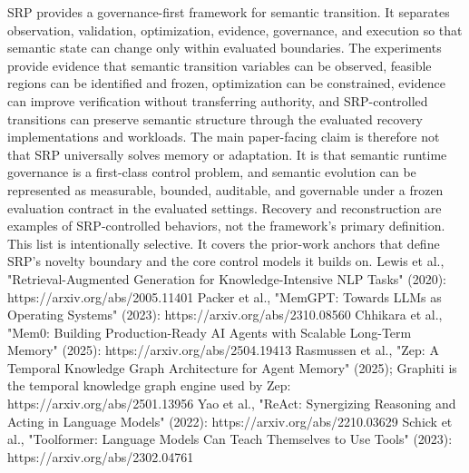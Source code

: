 {}
\markdownRendererSectionEnd \markdownRendererSectionBegin
{}\markdownRendererInterblockSeparator
{}SRP provides a governance-first framework for semantic transition. It separates observation, validation, optimization, evidence, governance, and execution so that semantic state can change only within evaluated boundaries. The experiments provide evidence that semantic transition variables can be observed, feasible regions can be identified and frozen, optimization can be constrained, evidence can improve verification without transferring authority, and SRP-controlled transitions can preserve semantic structure through the evaluated recovery implementations and workloads.\markdownRendererParagraphSeparator
{}The main paper-facing claim is therefore not that SRP universally solves memory or adaptation. It is that semantic runtime governance is a first-class control problem, and semantic evolution can be represented as measurable, bounded, auditable, and governable under a frozen evaluation contract in the evaluated settings. Recovery and reconstruction are examples of SRP-controlled behaviors, not the framework's primary definition.\markdownRendererInterblockSeparator
{}
\markdownRendererSectionEnd \markdownRendererSectionBegin
{}\markdownRendererInterblockSeparator
{}This list is intentionally selective. It covers the prior-work anchors that define SRP's novelty boundary and the core control models it builds on.\markdownRendererInterblockSeparator
{}\markdownRendererUlBeginTight
\markdownRendererUlItem Lewis et al., "Retrieval-Augmented Generation for Knowledge-Intensive NLP Tasks" (2020): https://arxiv.org/abs/2005.11401\markdownRendererUlItemEnd 
\markdownRendererUlItem Packer et al., "MemGPT: Towards LLMs as Operating Systems" (2023): https://arxiv.org/abs/2310.08560\markdownRendererUlItemEnd 
\markdownRendererUlItem Chhikara et al., "Mem0: Building Production-Ready AI Agents with Scalable Long-Term Memory" (2025): https://arxiv.org/abs/2504.19413\markdownRendererUlItemEnd 
\markdownRendererUlItem Rasmussen et al., "Zep: A Temporal Knowledge Graph Architecture for Agent Memory" (2025); Graphiti is the temporal knowledge graph engine used by Zep: https://arxiv.org/abs/2501.13956\markdownRendererUlItemEnd 
\markdownRendererUlItem Yao et al., "ReAct: Synergizing Reasoning and Acting in Language Models" (2022): https://arxiv.org/abs/2210.03629\markdownRendererUlItemEnd 
\markdownRendererUlItem Schick et al., "Toolformer: Language Models Can Teach Themselves to Use Tools" (2023): https://arxiv.org/abs/2302.04761\markdownRendererUlItemEnd 
